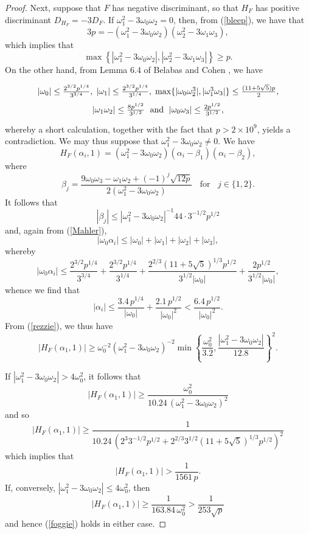 \begin{proof}
Next, suppose that $F$ has negative discriminant, so that $H_F$ has positive discriminant $D_{H_F}=-3 D_F$.  
If $\omega_1^2-3\omega_0 \omega_2=0$, then, from (\ref{bleep}), we have that
$$
3 p = - (\omega_1^2-3\omega_0 \omega_2) (\omega_2^2 - 3 \omega_1 \omega_3),
$$
which implies that
$$
\max \left\{ |\omega_1^2-3\omega_0 \omega_2|, |\omega_2^2 - 3 \omega_1 \omega_3| \right\} \geq p.
$$
On the other hand, from Lemma 6.4 of Belabas and Cohen \cite{BeCo}, we have
\begin{equation} \label{iota}
\arraycolsep=1.8pt\def\arraystretch{1.8}
\begin{array}{cc}
|\omega_0| \leq \frac{2^{3/2} p^{1/4}}{3^{3/4}}, \; 
|\omega_1| \leq \frac{2^{3/2} p^{1/4}}{3^{1/4}}, \; 
\max \{ |\omega_0 \omega_2^3|, |\omega_1^3 \omega_3| \} \leq \frac{(11+5 \sqrt{5}) p}{2}, \\
|\omega_1 \omega_2| \leq \frac{8 p^{1/2}}{3^{1/2}}
 \; \mbox{ and } \;
|\omega_0 \omega_3| \leq \frac{2 p^{1/2}}{3^{1/2}}, \\
\end{array}
\end{equation}
whereby a short calculation, together with the fact that $p > 2 \times 10^9$, yields a contradiction.
We may thus suppose that $\omega_1^2-3\omega_0 \omega_2 \neq 0$. We have
$$
H_F(\alpha_i,1) =  (\omega_1^2-3\omega_0 \omega_2)  \left(\alpha_i - \beta_1 \right) \left( \alpha_i - \beta_2 \right),
$$
where
$$
\beta_j = \frac{9 \omega_0 \omega_3 - \omega_1 \omega_2 + (-1)^j \sqrt{12 p}}{2 (\omega_1^2-3\omega_0 \omega_2)} \; \; \mbox{ for } \; \; j \in \{ 1, 2 \}.
$$
It follows that
$$
|\beta_j| \leq |\omega_1^2-3\omega_0 \omega_2|^{-1} 44 \cdot 3^{-1/2} p^{1/2}
$$
and, again from (\ref{Mahler}),
$$
|\omega_0 \alpha_i| \leq |\omega_0|+|\omega_1|+|\omega_2|+|\omega_3|,
$$
whereby
$$
|\omega_0 \alpha_i| \leq \frac{2^{3/2} p^{1/4}}{3^{3/4}}+\frac{2^{3/2} p^{1/4}}{3^{1/4}}+\frac{2^{2/3} \left(11+5 \sqrt{5} \right)^{1/3} p^{1/2}}{3^{1/2} |\omega_0|}+\frac{2 p^{1/2}}{3^{1/2}|\omega_0|},
$$
whence we find that
$$
|\alpha_i| \leq \frac{3.4 \, p^{1/4}}{|\omega_0|} + \frac{2.1 \, p^{1/2}}{|\omega_0|^2} < \frac{6.4 \, p^{1/2}}{|\omega_0|^2}.
$$
From (\ref{rezzie}), we thus have 
$$
\left|  H_F (\alpha_1,1)  \right| \geq  \omega_0^{-2} (\omega_1^2-3\omega_0 \omega_2)^{-2} \min \left\{ \frac{\omega_0^2}{3.2}, \frac{|\omega_1^2-3\omega_0 \omega_2|}{12.8} \right\}^{2}.
$$

If $|\omega_1^2-3\omega_0 \omega_2| > 4 \omega_0^2$, it follows that
$$
\left|  H_F (\alpha_1,1)  \right| \geq \frac{\omega_0^2}{10.24 \, (\omega_1^2-3\omega_0 \omega_2)^{2}}
$$
and so
$$
\left|  H_F (\alpha_1,1)  \right| \geq \frac{1}{10.24 \, (2^3 3^{-1/2} p^{1/2}+2^{2/3} 3^{1/2} \left(11+5 \sqrt{5} \right)^{1/3} p^{1/2})^{2}}
$$
which implies that
\begin{equation} \label{foggie}
\left|  H_F (\alpha_1,1)  \right| > \frac{1}{1561 \, p}.
\end{equation}
If, conversely, $|\omega_1^2-3\omega_0 \omega_2| \leq 4 \omega_0^2$, then
$$
\left|  H_F (\alpha_1,1)  \right| \geq \frac{1}{163.84 \, \omega_0^2} > \frac{1}{253 \sqrt{p}}
$$
and hence (\ref{foggie}) holds in either case.


\end{proof}
